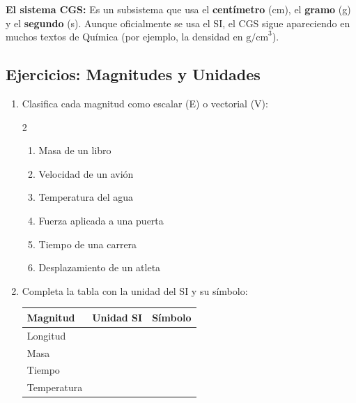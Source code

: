 \documentclass[12pt, letterpaper]{article}
\begin{document}
\begin{cuadroadvertencia}
  \textbf{El sistema CGS:} Es un subsistema que usa el \textbf{centímetro} (cm), el \textbf{gramo} (g) y el \textbf{segundo} (s). Aunque oficialmente se usa el SI, el CGS sigue apareciendo en muchos textos de Química (por ejemplo, la densidad en $\text{g/cm}^3$).
\end{cuadroadvertencia}


\subsection{Ejercicios: Magnitudes y Unidades}

\begin{enumerate}[leftmargin=*]
  \item \facil{} Clasifica cada magnitud como escalar (E) o vectorial (V):
        \begin{multicols}{2}
          \begin{enumerate}[label=\alph*)]
            \item Masa de un libro
            \item Velocidad de un avión
            \item Temperatura del agua
            \item Fuerza aplicada a una puerta
            \item Tiempo de una carrera
            \item Desplazamiento de un atleta
          \end{enumerate}
        \end{multicols}

  \item \facil{} Completa la tabla con la unidad del SI y su símbolo:
        \begin{center}
          \begin{tabular}{l|c|c}
            \textbf{Magnitud} & \textbf{Unidad SI} & \textbf{Símbolo} \\
            \hline
            Longitud          &                    &                  \\
            Masa              &                    &                  \\
            Tiempo            &                    &                  \\
            Temperatura       &                    &                  \\
          \end{tabular}
        \end{center}


\end{enumerate}
\end{document}
